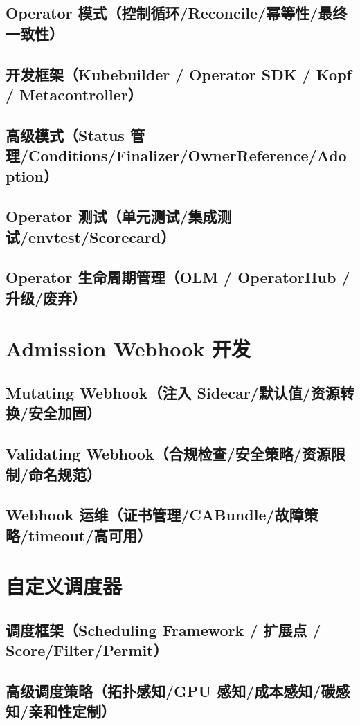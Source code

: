 \documentclass[12pt,UTF8]{ctexbook}
\begin{document}
    \subsection{Operator 模式（控制循环/Reconcile/幂等性/最终一致性）}
    \subsection{开发框架（Kubebuilder / Operator SDK / Kopf / Metacontroller）}
    \subsection{高级模式（Status 管理/Conditions/Finalizer/OwnerReference/Adoption）}
    \subsection{Operator 测试（单元测试/集成测试/envtest/Scorecard）}
    \subsection{Operator 生命周期管理（OLM / OperatorHub / 升级/废弃）}

  \section{Admission Webhook 开发}
    \subsection{Mutating Webhook（注入 Sidecar/默认值/资源转换/安全加固）}
    \subsection{Validating Webhook（合规检查/安全策略/资源限制/命名规范）}
    \subsection{Webhook 运维（证书管理/CABundle/故障策略/timeout/高可用）}

  \section{自定义调度器}
    \subsection{调度框架（Scheduling Framework / 扩展点 / Score/Filter/Permit）}
    \subsection{高级调度策略（拓扑感知/GPU 感知/成本感知/碳感知/亲和性定制）}
\end{document}
